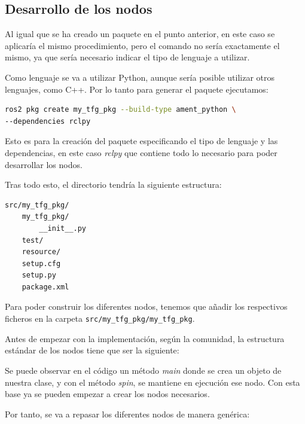 \subsection{Desarrollo de los nodos}

Al igual que se ha creado un paquete en el punto anterior, en este caso se aplicaría el mismo procedimiento, pero el comando no sería exactamente el mismo, ya que sería necesario indicar el tipo de lenguaje a utilizar.

Como lenguaje se va a utilizar Python, aunque sería posible utilizar otros lenguajes, como C++. Por lo tanto para generar el paquete ejecutamos:

\begin{lstlisting}[language=Bash, caption=Comando para la creación de un paquete de Python con ROS 2]
ros2 pkg create my_tfg_pkg --build-type ament_python \
--dependencies rclpy
\end{lstlisting}

Esto es para la creación del paquete especificando el tipo de lenguaje y las dependencias, en este caso \textit{rclpy} que contiene todo lo necesario para poder desarrollar los nodos.

Tras todo esto, el directorio tendría la siguiente estructura:

\begin{lstlisting}[language=Bash, caption=Estructura del directorio de desarrollo con Python]
src/my_tfg_pkg/
    my_tfg_pkg/
        __init__.py
    test/
    resource/
    setup.cfg
    setup.py
    package.xml
\end{lstlisting}

Para poder construir los diferentes nodos, tenemos que añadir los respectivos ficheros en la carpeta \verb|src/my_tfg_pkg/my_tfg_pkg|.

Antes de empezar con la implementación, según la comunidad, la estructura estándar de los nodos tiene que ser la siguiente:

\newpage




Se puede observar en el código un método \textit{main} donde se crea un objeto de nuestra clase, y con el método \textit{spin}, se mantiene en ejecución ese nodo. Con esta base ya se pueden empezar a crear los nodos necesarios.

Por tanto, se va a repasar los diferentes nodos de manera genérica:

